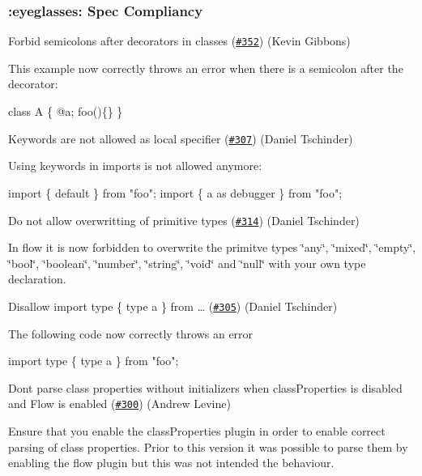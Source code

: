 \subsubsection*{\+:eyeglasses\+: Spec Compliancy}

Forbid semicolons after decorators in classes (\href{https://github.com/babel/babylon/pull/352}{\tt \#352}) (Kevin Gibbons)

This example now correctly throws an error when there is a semicolon after the decorator\+:


\begin{DoxyCode}
class A \{
@a;
foo()\{\}
\}
\end{DoxyCode}


Keywords are not allowed as local specifier (\href{https://github.com/babel/babylon/pull/307}{\tt \#307}) (Daniel Tschinder)

Using keywords in imports is not allowed anymore\+:


\begin{DoxyCode}
import \{ default \} from "foo";
import \{ a as debugger \} from "foo";
\end{DoxyCode}


Do not allow overwritting of primitive types (\href{https://github.com/babel/babylon/pull/314}{\tt \#314}) (Daniel Tschinder)

In flow it is now forbidden to overwrite the primitve types {\ttfamily \char`\"{}any\char`\"{}}, {\ttfamily \char`\"{}mixed\char`\"{}}, {\ttfamily \char`\"{}empty\char`\"{}}, {\ttfamily \char`\"{}bool\char`\"{}}, {\ttfamily \char`\"{}boolean\char`\"{}}, {\ttfamily \char`\"{}number\char`\"{}}, {\ttfamily \char`\"{}string\char`\"{}}, {\ttfamily \char`\"{}void\char`\"{}} and {\ttfamily \char`\"{}null\char`\"{}} with your own type declaration.

Disallow import type \{ type a \} from … (\href{https://github.com/babel/babylon/pull/305}{\tt \#305}) (Daniel Tschinder)

The following code now correctly throws an error


\begin{DoxyCode}
import type \{ type a \} from "foo";
\end{DoxyCode}


Don\textquotesingle{}t parse class properties without initializers when class\+Properties is disabled and Flow is enabled (\href{https://github.com/babel/babylon/pull/300}{\tt \#300}) (Andrew Levine)

Ensure that you enable the {\ttfamily class\+Properties} plugin in order to enable correct parsing of class properties. Prior to this version it was possible to parse them by enabling the {\ttfamily flow} plugin but this was not intended the behaviour.

